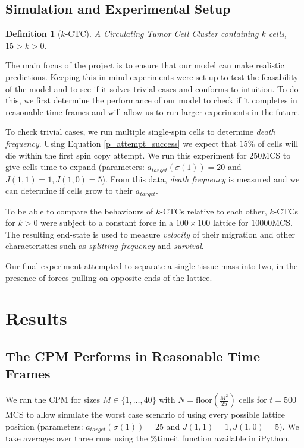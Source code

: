 \documentclass[12pt]{article}
\newtheorem{definition}{Definition}
\begin{document}
\subsection{Simulation and Experimental Setup}
\begin{definition}[$k$-CTC]
A Circulating Tumor Cell Cluster containing $k$ cells, $15>k>0$.
\end{definition}

The main focus of the project is to ensure that our model can make realistic predictions. Keeping this in mind experiments were set up to test the feasability of the model and to see if it solves trivial cases and conforms to intuition. To do this, we first determine the performance of our model to check if it completes in reasonable time frames and will allow us to run larger experiments in the future. 

To check trivial cases, we run multiple single-spin cells to determine \emph{death frequency}. Using Equation \ref{p_attempt_success} we expect that $15\%$ of cells will die within the first spin copy attempt. We run this experiment for $250$MCS to give cells time to expand (parameters: $a_{target}(\sigma(1))=20$ and $J(1,1)=1, J(1,0)=5$). From this data, \emph{death frequency} is measured and we can determine if cells grow to their $a_{target}$.

To be able to compare the behaviours of $k$-CTCs relative to each other, $k$-CTCs for $k>0$ were subject to a constant force in a $100\times100$ lattice for $10000$MCS. The resulting end-state is used to measure \emph{velocity} of their migration and other characteristics such as \emph{splitting frequency} and \emph{survival}.

Our final experiment attempted to separate a single tissue mass into two, in the presence of forces pulling on opposite ends of the lattice.

\section{Results}
\subsection{The CPM Performs in Reasonable Time Frames}
We ran the CPM for sizes $M\in\{1, \ldots , 40\}$ with $N=\text{floor}(\frac{M^2}{25})$ cells for $t=500$MCS to allow simulate the worst case scenario of using every possible lattice position (parameters: $a_{target}(\sigma(1))=25$ and $J(1,1)=1, J(1,0)=5$). We take averages over three runs using the \%timeit function available in iPython.
\end{document}
